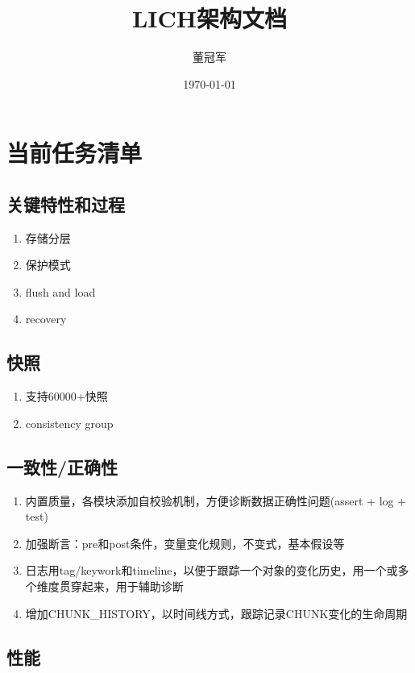 \documentclass[UTF8]{ctexart}
\title {LICH架构文档}
\author{董冠军}
\date{\today}
\begin{document}
\maketitle
\tableofcontents

\section{当前任务清单}

\subsection{关键特性和过程}

\begin{enumerate}
    \item 存储分层
    \item 保护模式
    \item flush and load
    \item recovery
\end{enumerate}

\subsection{快照}

\begin{enumerate}
    \item 支持60000+快照
    \item consistency group
\end{enumerate}

\subsection{一致性/正确性}

\begin{enumerate}
    \item 内置质量，各模块添加自校验机制，方便诊断数据正确性问题(assert + log + test)
    \item 加强断言：pre和post条件，变量变化规则，不变式，基本假设等
    \item 日志用tag/keywork和timeline，以便于跟踪一个对象的变化历史，用一个或多个维度贯穿起来，用于辅助诊断
    \item 增加CHUNK\_HISTORY，以时间线方式，跟踪记录CHUNK变化的生命周期
\end{enumerate}

\subsection{性能}
\end{document}
